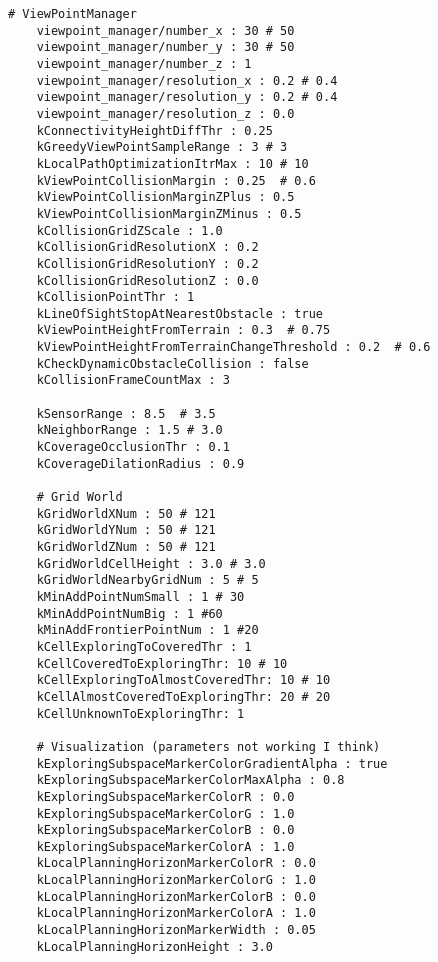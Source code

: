 \begin{lstlisting}[style=yaml, caption={TARE planner parameter configuration for Unitree GO2}, label={lst:tare_config}]
    # ViewPointManager
    viewpoint_manager/number_x : 30 # 50
    viewpoint_manager/number_y : 30 # 50
    viewpoint_manager/number_z : 1
    viewpoint_manager/resolution_x : 0.2 # 0.4
    viewpoint_manager/resolution_y : 0.2 # 0.4
    viewpoint_manager/resolution_z : 0.0
    kConnectivityHeightDiffThr : 0.25
    kGreedyViewPointSampleRange : 3 # 3
    kLocalPathOptimizationItrMax : 10 # 10
    kViewPointCollisionMargin : 0.25  # 0.6
    kViewPointCollisionMarginZPlus : 0.5
    kViewPointCollisionMarginZMinus : 0.5
    kCollisionGridZScale : 1.0
    kCollisionGridResolutionX : 0.2
    kCollisionGridResolutionY : 0.2
    kCollisionGridResolutionZ : 0.0
    kCollisionPointThr : 1
    kLineOfSightStopAtNearestObstacle : true
    kViewPointHeightFromTerrain : 0.3  # 0.75
    kViewPointHeightFromTerrainChangeThreshold : 0.2  # 0.6
    kCheckDynamicObstacleCollision : false
    kCollisionFrameCountMax : 3

    kSensorRange : 8.5  # 3.5
    kNeighborRange : 1.5 # 3.0
    kCoverageOcclusionThr : 0.1
    kCoverageDilationRadius : 0.9

    # Grid World
    kGridWorldXNum : 50 # 121
    kGridWorldYNum : 50 # 121
    kGridWorldZNum : 50 # 121
    kGridWorldCellHeight : 3.0 # 3.0
    kGridWorldNearbyGridNum : 5 # 5
    kMinAddPointNumSmall : 1 # 30
    kMinAddPointNumBig : 1 #60
    kMinAddFrontierPointNum : 1 #20
    kCellExploringToCoveredThr : 1
    kCellCoveredToExploringThr: 10 # 10
    kCellExploringToAlmostCoveredThr: 10 # 10
    kCellAlmostCoveredToExploringThr: 20 # 20
    kCellUnknownToExploringThr: 1

    # Visualization (parameters not working I think)
    kExploringSubspaceMarkerColorGradientAlpha : true
    kExploringSubspaceMarkerColorMaxAlpha : 0.8
    kExploringSubspaceMarkerColorR : 0.0
    kExploringSubspaceMarkerColorG : 1.0
    kExploringSubspaceMarkerColorB : 0.0
    kExploringSubspaceMarkerColorA : 1.0
    kLocalPlanningHorizonMarkerColorR : 0.0
    kLocalPlanningHorizonMarkerColorG : 1.0
    kLocalPlanningHorizonMarkerColorB : 0.0
    kLocalPlanningHorizonMarkerColorA : 1.0
    kLocalPlanningHorizonMarkerWidth : 0.05
    kLocalPlanningHorizonHeight : 3.0

\end{lstlisting}

